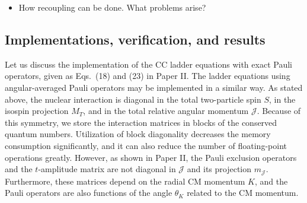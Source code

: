 \documentclass[a4paper,12pt]{report}
\begin{document}
\begin{itemize}
\item How recoupling can be done. What problems arise? 
\end{itemize}


\subsection{Implementations, verification, and results}

Let us discuss the implementation of the CC 
ladder equations with exact Pauli operators, given
as Eqs.~(18) and (23) in Paper II. The ladder 
equations using angular-averaged Pauli operators
may be implemented in a similar way. As stated above,
the nuclear interaction is diagonal in the total
two-particle spin $S$, in the isospin projection  
$M_{T}$, and in the total relative angular momentum
$\mathcal{J}$. Because of this symmetry, we store
the interaction matrices in blocks of the conserved
quantum numbers. Utilization of block diagonality
decreases the memory consumption significantly, and
it can also reduce the number of floating-point
operations greatly. However, as shown in Paper II,
the Pauli exclusion operators and the $t$-amplitude
matrix are not diagonal in $\mathcal{J}$ and its 
projection $m_{\mathcal{J}}$. Furthermore, these 
matrices depend on the radial CM momentum $K$,
and the Pauli operators are also functions of the
angle $\theta_{K}$ related to the CM momentum. 
\end{document}
